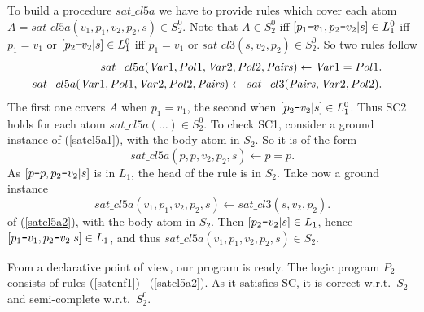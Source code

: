 \documentclass{tlp}
\newcommand*{\mydash}{{\mbox{\tt-}}}
\begin{document}
To build a procedure $sat\_cl5a$ we have to provide rules
which cover each atom $A= sat\_cl5a(v_1, p_1, v_2, p_2, s)\in S_2^0$.
  Note that $A\in S_2^0$ iff
$[p_1\mydash v_1,p_2\mydash v_2|s]\in L_1^0$ iff
$p_1=v_1$ or $[p_2\mydash v_2|s]\in L_1^0$ iff
$p_1=v_1$ or $sat\_cl3(s,v_2,p_2)\in S_2^0$.
So two rules follow
{\sloppy
  \begin{eqnarray}
  &&\hspace{-2em}
  sat\_cl5a({\it Var}1, Pol1, {\it Var}2, Pol2, {\it Pairs}) \gets {\it Var}1 = Pol1.
  \label{satcl5a1}
  \\
  &&\hspace{-2em}
  sat\_cl5a({\it Var}1, Pol1, {\it Var}2, Pol2, {\it Pairs}) \gets sat\_cl3( {\it Pairs}, {\it Var}2, Pol2).
  \label{satcl5a2}
  \end{eqnarray}
}The first one covers $A$ when $p_1=v_1$, the second when
$[p_2\mydash v_2|s]\in L_1^0$.
Thus SC2 holds for each atom $sat\_cl5a(\ldots)\in S_2^0$.
To check SC1,
consider a ground instance of (\ref{satcl5a1}), with the body atom in $S_2$.
So it is of the form
\[
sat\_cl5a(p, p, v_2, p_2, s)
 \gets p= p.
\]
As
$[p\mydash p,p_2\mydash v_2|s]$ is in $L_1$, the head of the rule is in
$S_2$.
Take now a ground instance 
$$
sat\_cl5a(v_1, p_1, v_2, p_2, s) \gets sat\_cl3( s, v_2, p_2).
$$
of (\ref{satcl5a2}), with the body atom in $S_2$.
Then $[p_2\mydash v_2|s]\in L_1$,
hence $[p_1\mydash v_1,p_2\mydash v_2|s]\in L_1$,
and thus $sat\_cl5a(v_1, p_1, v_2, p_2, s)\in S_2$.

From a declarative point of view, our program is ready.
The logic program $P_2$ consists of rules 
(\ref{satcnf1})\,--\,(\ref{satcl5a2}).
As it satisfies SC,
it is correct  w.r.t.\ $S_2$ and semi-complete w.r.t.~$S_2^0$.
\end{document}
